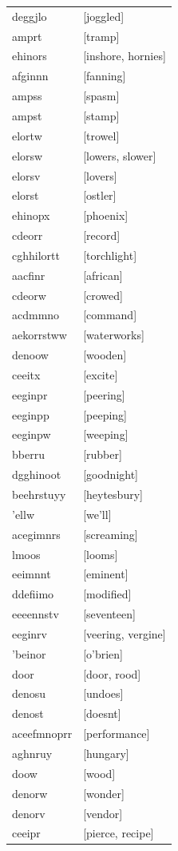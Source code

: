 \documentclass{article}
\begin{document}
\begin{tabular}{ll}
deggjlo & [joggled] \\
amprt & [tramp] \\
ehinors & [inshore, hornies] \\
afginnn & [fanning] \\
ampss & [spasm] \\
ampst & [stamp] \\
elortw & [trowel] \\
elorsw & [lowers, slower] \\
elorsv & [lovers] \\
elorst & [ostler] \\
ehinopx & [phoenix] \\
cdeorr & [record] \\
cghhilortt & [torchlight] \\
aacfinr & [african] \\
cdeorw & [crowed] \\
acdmmno & [command] \\
aekorrstww & [waterworks] \\
denoow & [wooden] \\
ceeitx & [excite] \\
eeginpr & [peering] \\
eeginpp & [peeping] \\
eeginpw & [weeping] \\
bberru & [rubber] \\
dgghinoot & [goodnight] \\
beehrstuyy & [heytesbury] \\
'ellw & [we'll] \\
acegimnrs & [screaming] \\
lmoos & [looms] \\
eeimnnt & [eminent] \\
ddefiimo & [modified] \\
eeeennstv & [seventeen] \\
eeginrv & [veering, vergine] \\
'beinor & [o'brien] \\
door & [door, rood] \\
denosu & [undoes] \\
denost & [doesnt] \\
aceefmnoprr & [performance] \\
aghnruy & [hungary] \\
doow & [wood] \\
denorw & [wonder] \\
denorv & [vendor] \\
ceeipr & [pierce, recipe] \\

\end{tabular}
\end{document}
